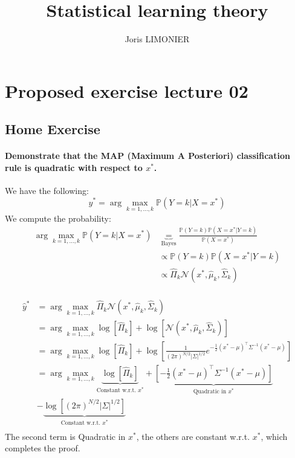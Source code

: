 \documentclass{article}
\title{Statistical learning theory}
\author{Joris LIMONIER}
\newcommand{\1}{\mathbf{1}}
\renewcommand{\P}{\mathbb{P}}
\begin{document}
\maketitle

\tableofcontents

\section{Proposed exercise lecture 02}
\subsection{Home Exercise}
\paragraph{Demonstrate that the MAP (Maximum A Posteriori) classification rule is quadratic with respect to $x^*$.}

We have the following:
\begin{equation}
  \hat{y}^* = \arg \max_{k = 1, \ldots, k} \P \left( Y=k | X = x^* \right)
\end{equation}
We compute the probability:
\begin{align*}
  \arg \max_{k = 1, \ldots, k} \P \left( Y=k | X = x^* \right)
   & \underbrace{=}_{\text{Bayes}} \frac{\P(Y=k) \P(X=x^* | Y=k)}{\P(X=x^*)}        \\
   & \propto \P(Y=k) \P(X=x^* | Y=k)                                                \\
   & \propto \hat{\Pi}_k \mathcal{N}\left( x^*, \hat{\mu}_k, \hat{\Sigma}_k \right) \\
\end{align*}

\begin{align*}
  \hat{y}^*
   & = \arg \max_{k = 1, \ldots, k} \hat{\Pi}_k \mathcal{N}\left( x^*, \hat{\mu}_k, \hat{\Sigma}_k \right)                                                                                                                \\
   & = \arg \max_{k = 1, \ldots, k} \log \left[ \hat{\Pi}_k \right] + \log \left[\mathcal{N} \left( x^*, \hat{\mu}_k, \hat{\Sigma}_k \right) \right]                                                                      \\
   & = \arg \max_{k = 1, \ldots, k} \log \left[ \hat{\Pi}_k \right] + \log \left[\frac{1}{(2 \pi)^{N / 2}|\Sigma|^{1 / 2}} e^{-\frac{1}{2}(x^*-\mu)^{\top} \Sigma^{-1}(x^*-\mu)} \right]                                  \\
   & = \arg \max_{k = 1, \ldots, k} \underbrace{\log \left[ \hat{\Pi}_k \right]}_{\text{Constant w.r.t. } x^*} + \underbrace{\left[ -\frac{1}{2}(x^*-\mu)^{\top} \Sigma^{-1}(x^*-\mu) \right]}_{\text{Quadratic in } x^*} \\
   & - \underbrace{\log \left[(2 \pi)^{N / 2}|\Sigma|^{1 / 2} \right]}_{\text{Constant w.r.t. } x^*}                                                                                                                      \\
\end{align*}
The second term is Quadratic in $x^*$, the others are constant w.r.t. $x^*$, which completes the proof.
\end{document}
